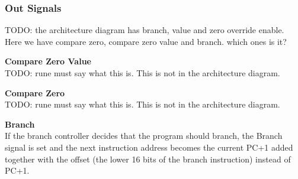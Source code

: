 \subsubsection{Out Signals}
TODO: the architecture diagram has branch, value and zero override enable. Here we have compare zero, compare zero value and branch. which ones is it?

\begin{description}
\item{\textbf{Compare Zero Value}} \\

TODO: rune must say what this is.
This is not in the architecture diagram.

\item{\textbf{Compare Zero}} \\

TODO: rune must say what this is.
This is not in the architecture diagram.

\item{\textbf{Branch}} \\

If the branch controller decides that the program should branch, the Branch signal is set and the next instruction address becomes the current PC+1 added together with the offset (the lower 16 bits of the branch instruction) instead of PC+1.

\end{description}
